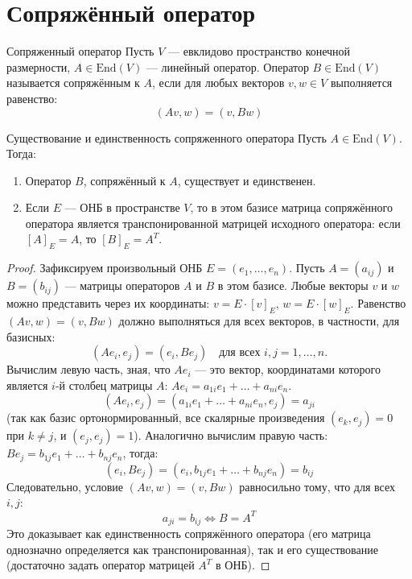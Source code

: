 \section{Сопряжённый оператор}

\begin{Definition}{Сопряженный оператор}{}
	Пусть $V$ — евклидово пространство конечной размерности, $A \in \mathrm{End}(V)$ — линейный оператор.
	Оператор $B \in \mathrm{End}(V)$ называется сопряжённым к $A$, если для любых векторов $v, w \in V$ выполняется равенство:
	\[
	(Av, w) = (v, Bw)
	\] 
\end{Definition}

\begin{Proposition}{Существование и единственность сопряженного оператора}{}
	Пусть $A \in \mathrm{End}(V)$.
	Тогда:
	\begin{enumerate}
		\item Оператор $B$, сопряжённый к $A$, существует и единственен.
		\item Если $E$ — ОНБ в пространстве $V$, то в этом базисе матрица сопряжённого оператора является транспонированной матрицей исходного оператора: если $[A]_E = A$, то $[B]_E = A^T$.
	\end{enumerate}
\end{Proposition}

\begin{proof}
	Зафиксируем произвольный ОНБ $E = (e_1, \dots, e_n)$. Пусть $A = (a_{ij})$ и $B = (b_{ij})$ — матрицы операторов $A$ и $B$ в этом базисе.
	Любые векторы $v$ и $w$ можно представить через их координаты: $v = E \cdot [v]_E$, $w = E \cdot [w]_E$.
	Равенство $(Av, w) = (v, Bw)$ должно выполняться для всех векторов, в частности, для базисных:
	\[
	(Ae_i, e_j) = (e_i, Be_j) \quad \text{для всех } i, j = 1, \dots, n.
	\] 
	Вычислим левую часть, зная, что $Ae_i$ — это вектор, координатами которого является $i$-й столбец матрицы $A$: $Ae_i = a_{1i}e_1 + \dots + a_{ni}e_n$.
	\[
	(Ae_i, e_j) = (a_{1i}e_1 + \dots + a_{ni}e_n, e_j) = a_{ji}
	\] 
	(так как базис ортонормированный, все скалярные произведения $(e_k, e_j) = 0$ при $k \neq j$, и $(e_j, e_j) = 1$).
	Аналогично вычислим правую часть: $Be_j = b_{1j}e_1 + \dots + b_{nj}e_n$, тогда:
	\[
	(e_i, Be_j) = (e_i, b_{1j}e_1 + \dots + b_{nj}e_n) = b_{ij}
	\] 
	Следовательно, условие $(Av, w) = (v, Bw)$ равносильно тому, что для всех $i, j$:
	\[
	a_{ji} = b_{ij} \iff B = A^T
	\] 
	Это доказывает как единственность сопряжённого оператора (его матрица однозначно определяется как транспонированная), так и его существование (достаточно задать оператор матрицей $A^T$ в ОНБ).
\end{proof}

